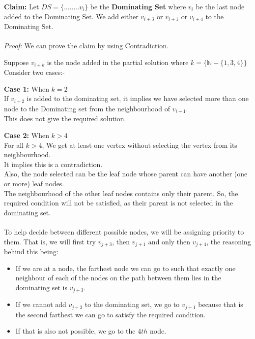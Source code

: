 \documentclass[letterpaper, 11pt]{article}
\begin{document}
\textbf{Claim:} Let $DS = \{ ........ v_{i}\}$ be the \textbf{Dominating Set} where $v_{i}$ be the last node added to the Dominating Set. We add either $v_{i+3}$ or $v_{i+1}$ or $v_{i+4}$ to the Dominating Set.
\\\\
\textit{Proof:} We can prove the claim by using Contradiction.
\begin{adjustwidth}{0.5cm}{}
Suppose $v_{i+k}$ is the node added in the partial solution where $k=\{\mathbb{N} - \{1,3,4\}\}$\\
Consider two cases:-
\begin{adjustwidth}{0.5cm}{}
\textbf{Case 1:} When $k = 2$ \\
   If $v_{i+2}$ is added to the dominating set, it  implies we have selected more than one
node to the Dominating set from the neighbourhood of $v_{i+1}$.\\
	This does not give the required solution. 

\end{adjustwidth}
\begin{adjustwidth}{0.5cm}{}
\textbf{Case 2:} When $k > 4$ \\
    For all $k>4$, We get at least one vertex without selecting the vertex from its neighbourhood. \\
It implies this is a contradiction. \\
Also, the node selected can be the leaf node whose parent can have another (one or more) leaf nodes.\\
The neighbourhood of the other leaf nodes contains only their parent. So, the required condition will not be satisfied, as their parent is not selected in the dominating set.\\\\
To help decide between different possible nodes, we will be assigning priority to them.
That is, we will first try $v_{j+3}$, then $v_{j+1}$ and only then $v_{j+4}$, the reasoning behind this being:
\begin{itemize}
    \item If we are at a node, the farthest node we can go to such that exactly one neighbour of each of the nodes on the path between them lies in the dominating set is  $v_{j+3}$.
    \item If we cannot add $v_{j+3}$ to the dominating set, we go to $v_{j+1}$ because that is the second farthest we can go to satisfy the required condition.
    \item If that is also not possible, we go to the $4th$ node.\\\\
\end{itemize}
\end{adjustwidth}


\end{adjustwidth}
\end{document}
